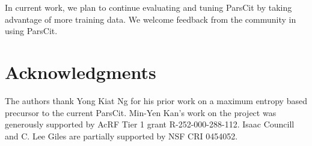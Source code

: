\documentclass[10pt, a4paper]{article}
\begin{document}
In current work, we plan to continue evaluating and tuning ParsCit by
taking advantage of more training data.  We welcome feedback from the
community in using ParsCit.

\section{Acknowledgments}

The authors thank Yong Kiat Ng for his prior work on a maximum entropy
based precursor to the current ParsCit.  Min-Yen Kan's work on the
project was generously supported by AcRF Tier 1 grant R-252-000-288-112.
Isaac Councill and C. Lee Giles are partially supported by NSF CRI 0454052.


\end{document}
